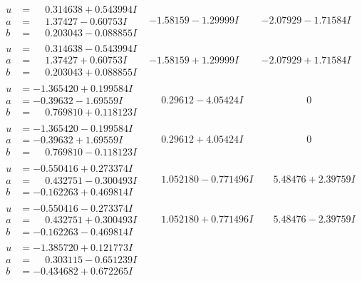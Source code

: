 \documentclass[1p]{elsarticle_modified}
\theoremstyle{definition}
\begin{document}
$$\begin{array}{c|c|c}
\begin{aligned}
u &= \phantom{-}0.314638 + 0.543994 I \\
a &= \phantom{-}1.37427 - 0.60753 I \\
b &= \phantom{-}0.203043 - 0.088855 I\end{aligned}
 & -1.58159 - 1.29999 I & -2.07929 - 1.71584 I \\ \hline\begin{aligned}
u &= \phantom{-}0.314638 - 0.543994 I \\
a &= \phantom{-}1.37427 + 0.60753 I \\
b &= \phantom{-}0.203043 + 0.088855 I\end{aligned}
 & -1.58159 + 1.29999 I & -2.07929 + 1.71584 I \\ \hline\begin{aligned}
u &= -1.365420 + 0.199584 I \\
a &= -0.39632 - 1.69559 I \\
b &= \phantom{-}0.769810 + 0.118123 I\end{aligned}
 & \phantom{-}0.29612 - 4.05424 I & \phantom{-0.000000 } 0 \\ \hline\begin{aligned}
u &= -1.365420 - 0.199584 I \\
a &= -0.39632 + 1.69559 I \\
b &= \phantom{-}0.769810 - 0.118123 I\end{aligned}
 & \phantom{-}0.29612 + 4.05424 I & \phantom{-0.000000 } 0 \\ \hline\begin{aligned}
u &= -0.550416 + 0.273374 I \\
a &= \phantom{-}0.432751 - 0.300493 I \\
b &= -0.162263 + 0.469814 I\end{aligned}
 & \phantom{-}1.052180 - 0.771496 I & \phantom{-}5.48476 + 2.39759 I \\ \hline\begin{aligned}
u &= -0.550416 - 0.273374 I \\
a &= \phantom{-}0.432751 + 0.300493 I \\
b &= -0.162263 - 0.469814 I\end{aligned}
 & \phantom{-}1.052180 + 0.771496 I & \phantom{-}5.48476 - 2.39759 I \\ \hline\begin{aligned}
u &= -1.385720 + 0.121773 I \\
a &= \phantom{-}0.303115 - 0.651239 I \\
b &= -0.434682 + 0.672265 I\end{aligned}

\end{array}$$
\end{document}
